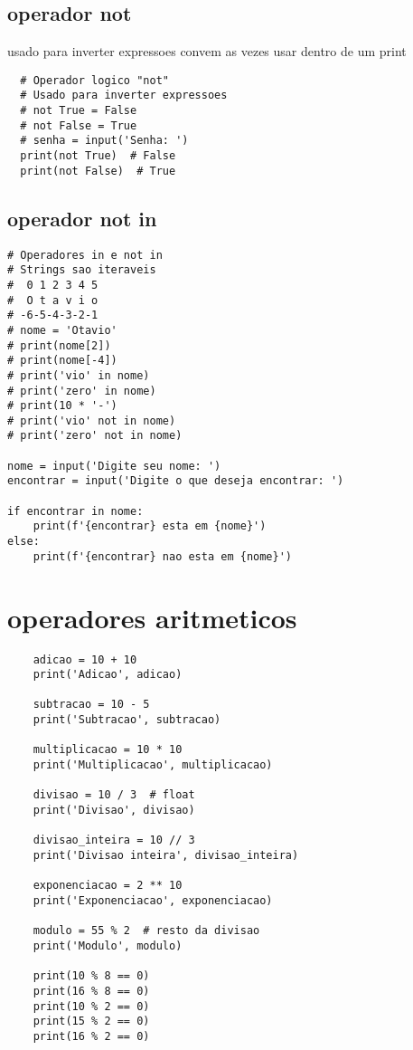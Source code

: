 \documentclass{article}
\begin{document}
  \subsection{operador not}
  usado para inverter expressoes convem as vezes usar dentro de um print 
  \begin{lstlisting}
  # Operador logico "not"
  # Usado para inverter expressoes
  # not True = False
  # not False = True
  # senha = input('Senha: ')
  print(not True)  # False
  print(not False)  # True
  \end{lstlisting} 
  \subsection{operador not in}
\begin{lstlisting}
# Operadores in e not in
# Strings sao iteraveis
#  0 1 2 3 4 5
#  O t a v i o
# -6-5-4-3-2-1
# nome = 'Otavio'
# print(nome[2])
# print(nome[-4])
# print('vio' in nome)
# print('zero' in nome)
# print(10 * '-')
# print('vio' not in nome)
# print('zero' not in nome)

nome = input('Digite seu nome: ')
encontrar = input('Digite o que deseja encontrar: ')

if encontrar in nome:
    print(f'{encontrar} esta em {nome}')
else:
    print(f'{encontrar} nao esta em {nome}')
\end{lstlisting}
\section{operadores aritmeticos}
  \begin{lstlisting}
    adicao = 10 + 10
    print('Adicao', adicao)
    
    subtracao = 10 - 5
    print('Subtracao', subtracao)
    
    multiplicacao = 10 * 10
    print('Multiplicacao', multiplicacao)
    
    divisao = 10 / 3  # float
    print('Divisao', divisao)
    
    divisao_inteira = 10 // 3
    print('Divisao inteira', divisao_inteira)
    
    exponenciacao = 2 ** 10
    print('Exponenciacao', exponenciacao)
    
    modulo = 55 % 2  # resto da divisao
    print('Modulo', modulo)
    
    print(10 % 8 == 0)
    print(16 % 8 == 0)
    print(10 % 2 == 0)
    print(15 % 2 == 0)
    print(16 % 2 == 0)
  \end{lstlisting}
\end{document}
